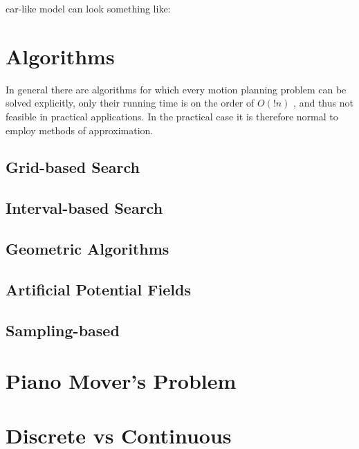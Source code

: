 car-like model can look something like:

\section{Algorithms}
In general there are algorithms for which every motion planning problem can be
solved explicitly, only their running time is on the order of \(O(!n)\) , and
thus not feasible in practical applications. In the practical case it is
therefore normal to employ methods of approximation.

\subsection{Grid-based Search}
\label{subsec:gridbasedsearch}

\subsection{Interval-based Search}
\label{subsec:intervalbasedsearch}

\subsection{Geometric Algorithms}
\label{subsec:geometricalgorithms}

\subsection{Artificial Potential Fields}
\label{subsec:artificialpotentialfields}

\subsection{Sampling-based}
\label{subsec:samplingbased}









\section{Piano Mover's Problem}

\section{Discrete vs Continuous}

